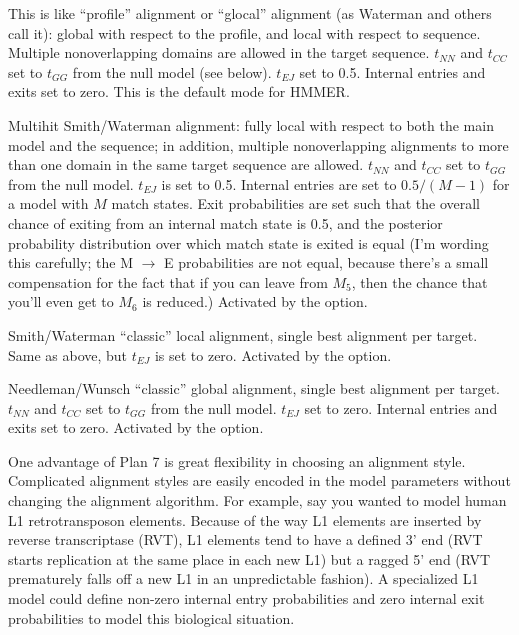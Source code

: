 \begin{wideitem}
\item [\emprog{hmmls}] This is like ``profile'' alignment or
``glocal'' alignment (as Waterman and others call it): global with
respect to the profile, and local with respect to sequence.  Multiple
nonoverlapping domains are allowed in the target sequence. $t_{NN}$
and $t_{CC}$ set to $t_{GG}$ from the null model (see below). $t_{EJ}$
set to 0.5. Internal entries and exits set to zero. This is the
default mode for HMMER.

\item [\emprog{hmmfs}] Multihit Smith/Waterman alignment: fully local
with respect to both the main model and the sequence; in addition,
multiple nonoverlapping alignments to more than one domain in the same
target sequence are allowed.  $t_{NN}$ and $t_{CC}$ set to $t_{GG}$
from the null model.  $t_{EJ}$ is set to 0.5.  Internal entries are
set to $0.5/(M-1)$ for a model with $M$ match states. Exit
probabilities are set such that the overall chance of exiting from an
internal match state is 0.5, and the posterior probability
distribution over which match state is exited is equal (I'm wording
this carefully; the M $\rightarrow$ E probabilities are not equal,
because there's a small compensation for the fact that if you can
leave from $M_5$, then the chance that you'll even get to $M_6$ is
reduced.) Activated by the  option.

\item [\emprog{hmmsw}] Smith/Waterman ``classic'' local alignment,
single best alignment per target. Same as  above, but
$t_{EJ}$ is set to zero. Activated by the  option.

\item [\emprog{hmms}] Needleman/Wunsch ``classic'' global alignment,
single best alignment per target. $t_{NN}$ and $t_{CC}$ set to
$t_{GG}$ from the null model. $t_{EJ}$ set to zero. Internal entries
and exits set to zero.  Activated by the  option.
\end{wideitem}

One advantage of Plan 7 is great flexibility in choosing an alignment
style. Complicated alignment styles are easily encoded in the model
parameters without changing the alignment algorithm.  For example, say
you wanted to model human L1 retrotransposon elements. Because of the
way L1 elements are inserted by reverse transcriptase (RVT), L1
elements tend to have a defined 3' end (RVT starts replication at the
same place in each new L1) but a ragged 5' end (RVT prematurely falls
off a new L1 in an unpredictable fashion). A specialized L1 model
could define non-zero internal entry probabilities and zero internal
exit probabilities to model this biological situation.

